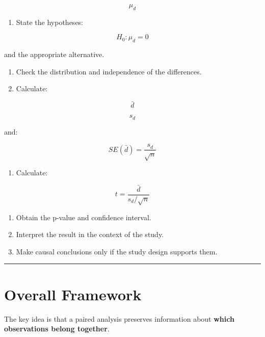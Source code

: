 \documentclass[
  letterpaper,
  DIV=11,
  numbers=noendperiod]{scrreprt}
\providecommand{\tightlist}{%
  \setlength{\itemsep}{0pt}\setlength{\parskip}{0pt}}
\begin{document}
\[
\mu_d
\]

\begin{enumerate}
\def\labelenumi{\arabic{enumi}.}
\setcounter{enumi}{4}
\tightlist
\item
  State the hypotheses:
\end{enumerate}

\[
H_0:\mu_d=0
\]

and the appropriate alternative.

\begin{enumerate}
\def\labelenumi{\arabic{enumi}.}
\setcounter{enumi}{5}
\tightlist
\item
  Check the distribution and independence of the differences.
\item
  Calculate:
\end{enumerate}

\[
\bar{d}
\]

\[
s_d
\]

and:

\[
SE(\bar{d})
=
\frac{s_d}{\sqrt{n}}
\]

\begin{enumerate}
\def\labelenumi{\arabic{enumi}.}
\setcounter{enumi}{7}
\tightlist
\item
  Calculate:
\end{enumerate}

\[
t=
\frac{\bar{d}}
{s_d/\sqrt{n}}
\]

\begin{enumerate}
\def\labelenumi{\arabic{enumi}.}
\setcounter{enumi}{8}
\tightlist
\item
  Obtain the p-value and confidence interval.
\item
  Interpret the result in the context of the study.
\item
  Make causal conclusions only if the study design supports them.
\end{enumerate}

\begin{center}\rule{0.5\linewidth}{0.5pt}\end{center}


\chapter{Overall Framework}\label{overall-framework}

The key idea is that a paired analysis preserves information about
\textbf{which observations belong together}.
\end{document}
